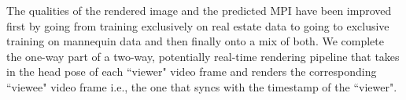 The qualities of the rendered image and the predicted MPI have been improved first by going from training exclusively on real estate data to going to exclusive training on mannequin data and then finally onto a mix of both. We complete the one-way part of a two-way, potentially real-time rendering pipeline that takes in the head pose of each ``viewer" video frame and renders the corresponding ``viewee" video frame i.e., the one that syncs with the timestamp of the ``viewer".



